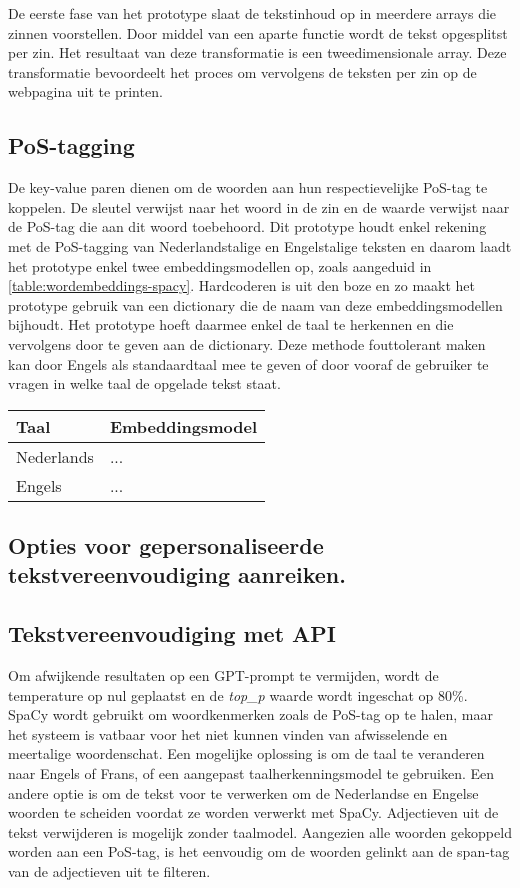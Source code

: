 De eerste fase van het prototype slaat de tekstinhoud op in meerdere arrays die zinnen voorstellen. Door middel van een aparte functie wordt de tekst opgesplitst per zin. Het resultaat van deze transformatie is een tweedimensionale array. Deze transformatie bevoordeelt het proces om vervolgens de teksten per zin op de webpagina uit te printen. 

\subsection{PoS-tagging}

De key-value paren dienen om de woorden aan hun respectievelijke PoS-tag te koppelen. De sleutel verwijst naar het woord in de zin en de waarde verwijst naar de PoS-tag die aan dit woord toebehoord.  Dit prototype houdt enkel rekening met de PoS-tagging van Nederlandstalige en Engelstalige teksten en daarom laadt het prototype enkel twee embeddingsmodellen op, zoals aangeduid in \ref{table:wordembeddings-spacy}. Hardcoderen is uit den boze en zo maakt het prototype gebruik van een dictionary die de naam van deze embeddingsmodellen bijhoudt. Het prototype hoeft daarmee enkel de taal te herkennen en die vervolgens door te geven aan de dictionary. Deze methode fouttolerant maken kan door Engels als standaardtaal mee te geven of door vooraf de gebruiker te vragen in welke taal de opgelade tekst staat.

\begin{center}
	\begin{tabular}{ | m{4cm} | m{12cm} | } 
		\hline
		\textbf{Taal} & \textbf{Embeddingsmodel} \\
		\hline
		Nederlands & ... \\ 
		\hline
		Engels & ... \\
		\hline
	\end{tabular}
	\label{table:wordembeddings-spacy}
\end{center}

\subsection{Opties voor gepersonaliseerde tekstvereenvoudiging aanreiken.}

\subsection{Tekstvereenvoudiging met API}

Om afwijkende resultaten op een GPT-prompt te vermijden, wordt de temperature op nul geplaatst en de \textit{top\_p} waarde wordt ingeschat op 80\%. SpaCy wordt gebruikt om woordkenmerken zoals de PoS-tag op te halen, maar het systeem is vatbaar voor het niet kunnen vinden van afwisselende en meertalige woordenschat. Een mogelijke oplossing is om de taal te veranderen naar Engels of Frans, of een aangepast taalherkenningsmodel te gebruiken. Een andere optie is om de tekst voor te verwerken om de Nederlandse en Engelse woorden te scheiden voordat ze worden verwerkt met SpaCy. Adjectieven uit de tekst verwijderen is mogelijk zonder taalmodel. Aangezien alle woorden gekoppeld worden aan een PoS-tag, is het eenvoudig om de woorden gelinkt aan de span-tag van de adjectieven uit te filteren.

